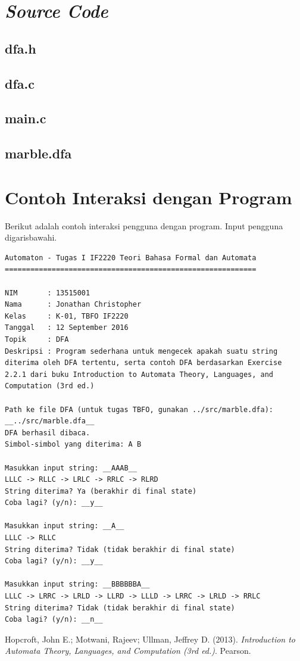 \documentclass[a4paper,titlepage]{article}
\begin{document}
	\section{\textit{Source Code}}

		\subsection{dfa.h}
			

		\subsection{dfa.c}
			

		\subsection{main.c}
			

		\subsection{marble.dfa}
			

	\section{Contoh Interaksi dengan Program}

		Berikut adalah contoh interaksi pengguna dengan program. Input pengguna digarisbawahi.

		\begin{lstlisting}
Automaton - Tugas I IF2220 Teori Bahasa Formal dan Automata
===========================================================

NIM       : 13515001
Nama      : Jonathan Christopher
Kelas     : K-01, TBFO IF2220
Tanggal   : 12 September 2016
Topik     : DFA
Deskripsi : Program sederhana untuk mengecek apakah suatu string diterima oleh DFA tertentu, serta contoh DFA berdasarkan Exercise 2.2.1 dari buku Introduction to Automata Theory, Languages, and Computation (3rd ed.)

Path ke file DFA (untuk tugas TBFO, gunakan ../src/marble.dfa): __../src/marble.dfa__
DFA berhasil dibaca.
Simbol-simbol yang diterima: A B

Masukkan input string: __AAAB__
LLLC -> RLLC -> LRLC -> RRLC -> RLRD
String diterima? Ya (berakhir di final state)
Coba lagi? (y/n): __y__

Masukkan input string: __A__
LLLC -> RLLC
String diterima? Tidak (tidak berakhir di final state)
Coba lagi? (y/n): __y__

Masukkan input string: __BBBBBBA__
LLLC -> LRRC -> LRLD -> LLRD -> LLLD -> LRRC -> LRLD -> RRLC
String diterima? Tidak (tidak berakhir di final state)
Coba lagi? (y/n): __n__

		\end{lstlisting}

	\begin{thebibliography}{9}

		Hopcroft, John E.; Motwani, Rajeev; Ullman, Jeffrey D.
		(2013).
		\textit{Introduction to Automata Theory, Languages, and Computation (3rd ed.)}.
		Pearson.

	\end{thebibliography}
\end{document}
